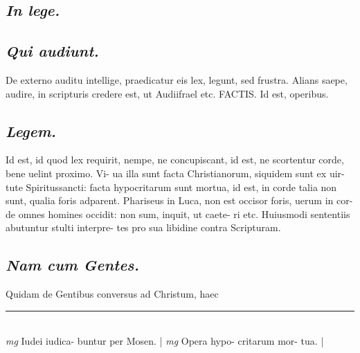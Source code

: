 \documentclass{article}
\begin{document}
\begin{pages}
\subsection*{\textit{In lege. }}
{}
\subsection*{\textit{Qui audiunt. }}\pstart De externo auditu intellige, praedicatur eis lex, legunt, sed frustra. Alians saepe, audire, in scripturis credere est, ut Audiifrael etc. FACTIS.  Id est, operibus.   \pend
{}
{}
\subsection*{\textit{Legem. }}\pstart Id est, id quod lex requirit, nempe, ne concupiscant, id est, ne scortentur corde, bene uelint proximo. Vi- ua illa sunt facta Christianorum, siquidem sunt ex uir- tute Spiritussancti: facta hypocritarum sunt mortua, id est, in corde talia non sunt, qualia foris adparent.  Phariseus in Luca, non est occisor foris, uerum in cor- de omnes homines occidit: non sum, inquit, ut caete- ri etc. Huiusmodi sententiis abutuntur stulti interpre- tes pro sua libidine contra Scripturam.   \pend
{}
{}
\subsection*{\textit{Nam cum Gentes. }}\pstart Quidam de Gentibus conversus ad Christum, haec  \pend
\vspace{0.5cm}\noindent
\vspace{0.2cm}\rule{1cm}{0.2pt}\\ 
\hspace{0.2cm}\textit{mg}
\footnotesize Iudei iudica- buntur per Mosen.  
\normalsize| 
\hspace{0.2cm}\textit{mg}
\footnotesize Opera hypo- critarum mor- tua.  
\normalsize| 

\end{pages}
\end{document}
